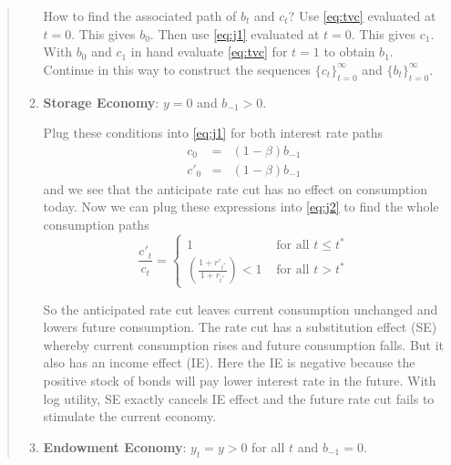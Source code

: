 \begin{exercise}
\begin{quote}
\begin{enumerate}
How to find the associated path of $b_t$ and $c_t$? Use \eqref{eq:tvc} evaluated at $t=0$. This gives $b_0$. Then use \eqref{eq:j1} evaluated at $t=0$. This gives $c_1$. With $b_0$ and $c_1$ in hand evaluate \eqref{eq:tvc} for $t=1$ to obtain $b_1$. Continue in this way to construct the sequences $\{c_t\}_{t=0}^{\infty}$ and $\{b_t\}_{t=0}^{\infty}$. 

\item 
{\bf Storage Economy}: $y=0$ and $b_{-1}>0$.

Plug these conditions into \eqref{eq:j1} for both interest rate paths
\begin{eqnarray*}
    c_0 &=& (1-\beta)b_{-1} \\
    c'_0 &=& (1-\beta)b_{-1}
\end{eqnarray*}
and we see that the anticipate rate cut has no effect on consumption today. Now we can plug these expressions into \eqref{eq:j2} to find the whole consumption paths
\[
\frac{c'_t}{c_t} = \left\{  \begin{array}{ll}
1 & \mbox{ for all } t\le t^*\\
\left(\frac{1+r'_{t^*}}{1+r_{t^*}} \right) <1 & \mbox{ for all } t> t^*
\end{array}
\right.
\]

So the anticipated rate cut leaves current consumption unchanged and lowers future consumption. The rate cut has a substitution effect (SE) whereby current consumption rises and future consumption falls. But it also has an income effect (IE). Here the IE is negative because the positive stock of bonds will pay lower interest rate in the future. With log utility, SE exactly cancels IE effect and the future rate cut fails to stimulate the current economy. 

\item 
{\bf Endowment Economy}: $y_t = y>0$ for all $t$ and $b_{-1}=0$. 


\end{enumerate}
\end{quote}
\end{exercise}
